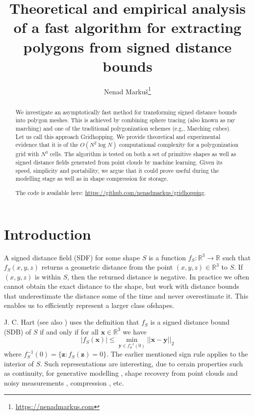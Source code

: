 \documentclass[11pt,twocolumn]{article}
\title{Theoretical and empirical analysis of a fast algorithm for extracting polygons from signed distance bounds}
\author{Nenad Marku\v{s}\footnote{\url{https://nenadmarkus.com}}}
\date{}
\begin{document}
	\maketitle

	\begin{abstract}
		We investigate an asymptotically fast method for transforming signed distance bounds into polygon meshes.
		This is achieved by combining sphere tracing (also known as ray marching) and one of the traditional polygonization schemes (e.g., Marching cubes).
		Let us call this approach Gridhopping.
		We provide theoretical and experimental evidence that it is of the $O(N^2\log N)$ computational complexity for a polygonization grid with $N^3$ cells.
		The algorithm is tested on both a set of primitive shapes as well as signed distance fields generated from point clouds by machine learning.
		Given its speed, simplicity and portability, we argue that it could prove useful during the modelling stage as well as in shape compression for storage.

		The code is available here: \url{https://github.com/nenadmarkus/gridhopping}.
	\end{abstract}

	\section{Introduction}
		A signed distance field (SDF) for some shape $S$ is a function $f_S:\mathbb{R}^3\rightarrow\mathbb{R}$ such that $f_S(x, y, z)$ returns a geometric distance from the point $(x, y, z)\in\mathbb{R}^3$ to $S$.
		If $(x, y, z)$ is within $S$, then the returned distance is negative.
		In practice we often cannot obtain the exact distance to the shape, but work with distance bounds that underestimate the distance some of the time and never overestimate it.
		This enables us to efficiently represent a larger class ofshapes.

		J. C. Hart \cite{Hart94spheretracing} (see also \cite{HartEtAl89rtfractals}) uses the definition that $f_S$ is a signed distance bound (SDB) of $S$ if and only if for all $\mathbf{x}\in\mathbb{R}^3$ we have
		$$
			\vert f_S(\mathbf{x})\vert\leq
			\min_{\mathbf{y}\in f_S^{-1}(0)}\vert\vert\mathbf{x} - \mathbf{y}\vert\vert_2
		$$
		where $f_S^{-1}(0)=\{\mathbf{z}: f_S(\mathbf{z})=0\}$.
		The earlier mentioned sign rule applies to the interior of $S$.
		Such representations are interesting, due to cerain properties such as continuity, for generative modelling \cite{GenShapeCVPR2019,DeepShapeCVPR2019}, shape recovery from point clouds and noisy measurements \cite{ShapeFromPtCould,SecretsOfWildSDFs2021}, compression \cite{davies2020overfit}, etc.
\end{document}
